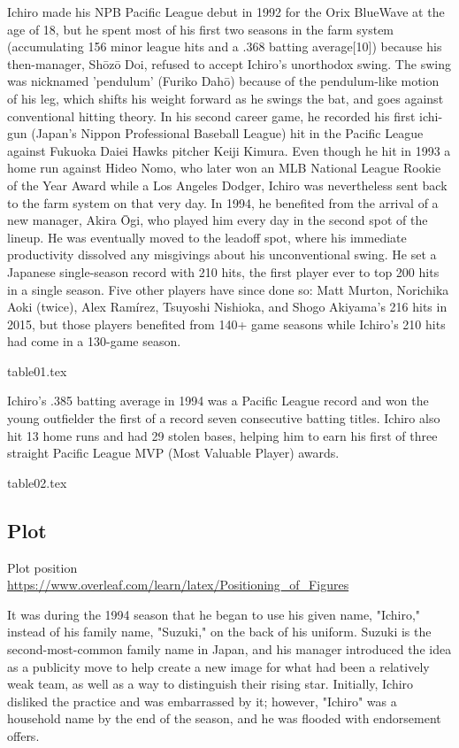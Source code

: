 \documentclass[12pt]{article}
\theoremstyle{hypotheses}
\begin{document}
Ichiro made his NPB Pacific League debut in 1992 for the Orix BlueWave at the age of 18, but he spent most of his first two seasons in the farm system (accumulating 156 minor league hits and a .368 batting average[10]) because his then-manager, Shōzō Doi, refused to accept Ichiro's unorthodox swing. The swing was nicknamed 'pendulum' (Furiko Dahō) because of the pendulum-like motion of his leg, which shifts his weight forward as he swings the bat, and goes against conventional hitting theory. In his second career game, he recorded his first ichi-gun (Japan's Nippon Professional Baseball League) hit in the Pacific League against Fukuoka Daiei Hawks pitcher Keiji Kimura. Even though he hit in 1993 a home run against Hideo Nomo, who later won an MLB National League Rookie of the Year Award while a Los Angeles Dodger, Ichiro was nevertheless sent back to the farm system on that very day. In 1994, he benefited from the arrival of a new manager, Akira Ōgi, who played him every day in the second spot of the lineup. He was eventually moved to the leadoff spot, where his immediate productivity dissolved any misgivings about his unconventional swing. He set a Japanese single-season record with 210 hits, the first player ever to top 200 hits in a single season. Five other players have since done so: Matt Murton, Norichika Aoki (twice), Alex Ramírez, Tsuyoshi Nishioka, and Shogo Akiyama's 216 hits in 2015, but those players benefited from 140+ game seasons while Ichiro's 210 hits had come in a 130-game season.

{table01.tex}

Ichiro's .385 batting average in 1994 was a Pacific League record and won the young outfielder the first of a record seven consecutive batting titles. Ichiro also hit 13 home runs and had 29 stolen bases, helping him to earn his first of three straight Pacific League MVP (Most Valuable Player) awards.

{table02.tex}


\subsection*{Plot}
Plot position\\
\url{https://www.overleaf.com/learn/latex/Positioning_of_Figures}

It was during the 1994 season that he began to use his given name, "Ichiro," instead of his family name, "Suzuki," on the back of his uniform. Suzuki is the second-most-common family name in Japan, and his manager introduced the idea as a publicity move to help create a new image for what had been a relatively weak team, as well as a way to distinguish their rising star. Initially, Ichiro disliked the practice and was embarrassed by it; however, "Ichiro" was a household name by the end of the season, and he was flooded with endorsement offers.
\end{document}
